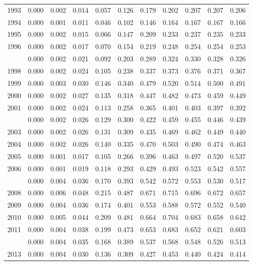 \documentclass[
]{article}
\begin{document}
\begin{longtable}[t]{lrrrrrrrrrr}
1993 & 0.000 & 0.002 & 0.014 & 0.057 & 0.126 & 0.179 & 0.202 & 0.207 & 0.207 & 0.206\\
1994 & 0.000 & 0.001 & 0.011 & 0.046 & 0.102 & 0.146 & 0.164 & 0.167 & 0.167 & 0.166\\
1995 & 0.000 & 0.002 & 0.015 & 0.066 & 0.147 & 0.209 & 0.233 & 0.237 & 0.235 & 0.233\\
1996 & 0.000 & 0.002 & 0.017 & 0.070 & 0.154 & 0.219 & 0.248 & 0.254 & 0.254 & 0.253\\
\addlinespace
1997 & 0.000 & 0.002 & 0.021 & 0.092 & 0.203 & 0.289 & 0.324 & 0.330 & 0.328 & 0.326\\
1998 & 0.000 & 0.002 & 0.024 & 0.105 & 0.238 & 0.337 & 0.373 & 0.376 & 0.371 & 0.367\\
1999 & 0.000 & 0.003 & 0.030 & 0.146 & 0.340 & 0.479 & 0.520 & 0.514 & 0.500 & 0.491\\
2000 & 0.000 & 0.002 & 0.027 & 0.135 & 0.318 & 0.447 & 0.482 & 0.473 & 0.459 & 0.449\\
2001 & 0.000 & 0.002 & 0.024 & 0.113 & 0.258 & 0.365 & 0.401 & 0.403 & 0.397 & 0.392\\
\addlinespace
2002 & 0.000 & 0.002 & 0.026 & 0.129 & 0.300 & 0.422 & 0.459 & 0.455 & 0.446 & 0.439\\
2003 & 0.000 & 0.002 & 0.026 & 0.131 & 0.309 & 0.435 & 0.469 & 0.462 & 0.449 & 0.440\\
2004 & 0.000 & 0.002 & 0.026 & 0.140 & 0.335 & 0.470 & 0.503 & 0.490 & 0.474 & 0.463\\
2005 & 0.000 & 0.001 & 0.017 & 0.105 & 0.266 & 0.396 & 0.463 & 0.497 & 0.520 & 0.537\\
2006 & 0.000 & 0.001 & 0.019 & 0.118 & 0.293 & 0.429 & 0.493 & 0.523 & 0.542 & 0.557\\
\addlinespace
2007 & 0.000 & 0.004 & 0.036 & 0.170 & 0.393 & 0.542 & 0.572 & 0.553 & 0.530 & 0.517\\
2008 & 0.000 & 0.006 & 0.048 & 0.215 & 0.487 & 0.671 & 0.715 & 0.696 & 0.672 & 0.657\\
2009 & 0.000 & 0.004 & 0.036 & 0.174 & 0.401 & 0.553 & 0.588 & 0.572 & 0.552 & 0.540\\
2010 & 0.000 & 0.005 & 0.044 & 0.209 & 0.481 & 0.664 & 0.704 & 0.683 & 0.658 & 0.642\\
2011 & 0.000 & 0.004 & 0.038 & 0.199 & 0.473 & 0.653 & 0.683 & 0.652 & 0.621 & 0.603\\
\addlinespace
2012 & 0.000 & 0.004 & 0.035 & 0.168 & 0.389 & 0.537 & 0.568 & 0.548 & 0.526 & 0.513\\
2013 & 0.000 & 0.004 & 0.030 & 0.136 & 0.309 & 0.427 & 0.453 & 0.440 & 0.424 & 0.414\\

\end{longtable}
\end{document}
